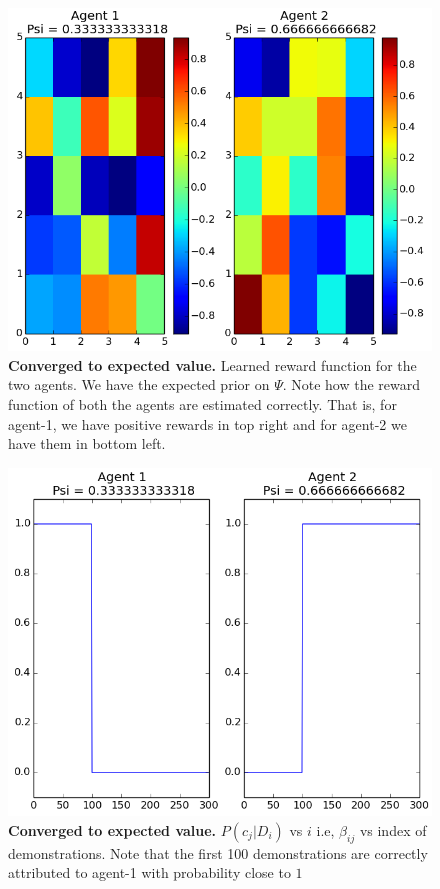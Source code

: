 \documentclass{article}[11pt]
\begin{document}
 \begin{figure}[H]
  \begin{center}
    \includegraphics[width=1\linewidth]{images/rewards6}
    \caption{\textbf{Converged to expected value.} Learned reward function for the two agents. We have the expected prior on $\Psi$. Note how the reward function of both the agents are estimated correctly. That is, for agent-1, we have positive rewards in top right and for agent-2 we have them in bottom left.}
    \label{fig:5grid}
  \end{center}
\end{figure}

 \begin{figure}[H]
  \begin{center}
    \includegraphics[width=1\linewidth]{images/P(c|D)6}
    \caption{\textbf{Converged to expected value.} $P(c_j|D_i)$ vs $i$ i.e, $\beta_{ij}$ vs index of demonstrations. Note that the first 100 demonstrations are correctly attributed to agent-1 with probability close to $1$}
    \label{fig:5grid}
  \end{center}
\end{figure}
\end{document}
